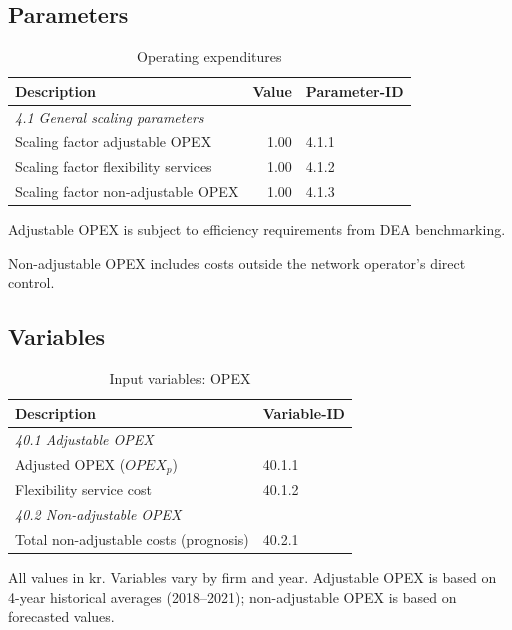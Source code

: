 \subsection{Parameters}

\begin{table}[H]
\centering
\footnotesize
\begin{threeparttable}
\caption{Operating expenditures}
\label{tab:opex-parameters}
\begin{tabular}{@{}lrl@{}}
\toprule
\textbf{Description} & \textbf{Value} & \textbf{Parameter-ID} \\
\midrule
\multicolumn{3}{l}{\textit{4.1 General scaling parameters}} \\
Scaling factor adjustable OPEX\tnote{a} & 1.00 & 4.1.1 \\
Scaling factor flexibility services & 1.00 & 4.1.2 \\
Scaling factor non-adjustable OPEX\tnote{b} & 1.00 & 4.1.3 \\
\bottomrule
\end{tabular}
\begin{tablenotes}
\item[a] Adjustable OPEX is subject to efficiency requirements from DEA benchmarking.
\item[b] Non-adjustable OPEX includes costs outside the network operator's direct control.
\end{tablenotes}
\end{threeparttable}
\end{table}

\subsection{Variables}

\begin{table}[H]
\centering
\footnotesize
\begin{threeparttable}
\caption{Input variables: OPEX}
\label{tab:opex-variables}
\begin{tabular}{@{}p{9cm}l@{}}
\toprule
\textbf{Description} & \textbf{Variable-ID} \\
\midrule
\multicolumn{2}{l}{\textit{40.1 Adjustable OPEX}} \\
Adjusted OPEX ($OPEX_p$) & 40.1.1 \\
Flexibility service cost & 40.1.2 \\
\midrule
\multicolumn{2}{l}{\textit{40.2 Non-adjustable OPEX}} \\
Total non-adjustable costs (prognosis) & 40.2.1 \\
\bottomrule
\end{tabular}
\begin{tablenotes}
\item All values in kr. Variables vary by firm and year. Adjustable OPEX is based on 4-year historical averages (2018--2021); non-adjustable OPEX is based on forecasted values.
\end{tablenotes}
\end{threeparttable}
\end{table}


